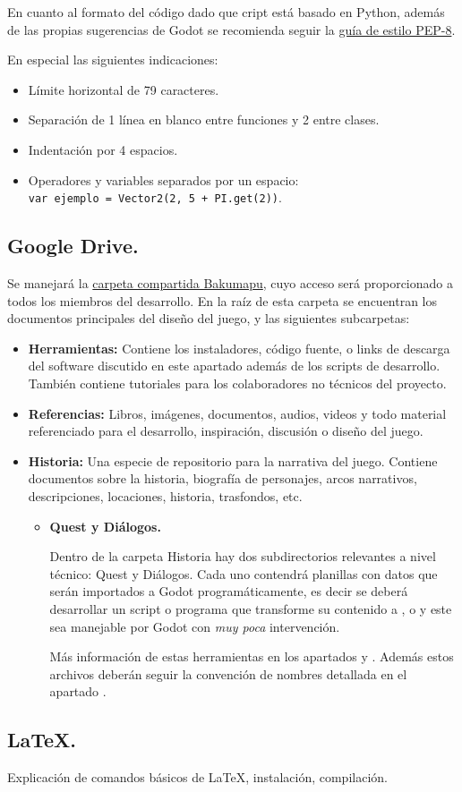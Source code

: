 En cuanto al formato del código dado que cript está basado en Python, además de las propias sugerencias de Godot se recomienda seguir la \href{https://www.python.org/dev/peps/pep-0008/}{guía de estilo PEP-8}.

En especial las siguientes indicaciones:
\begin{itemize}
	\item Límite horizontal de 79 caracteres. 
	\item Separación de 1 línea en blanco entre funciones y 2 entre clases.
	\item Indentación por 4 espacios.
	\item Operadores y variables separados por un espacio:\\\small \texttt{var ejemplo = Vector2(2, 5 + PI.get(2))}.
\end{itemize}





\subsection{Google Drive.}\label{flujo:google-drive}
Se manejará la \href{https://drive.google.com/open?id=1p8u-1UpXts8OHGRHEZLSIiQrqqx0Y4Kt}{carpeta compartida Bakumapu}, cuyo acceso será proporcionado a todos los miembros del desarrollo. En la raíz de esta carpeta se encuentran los documentos principales del diseño del juego, y las siguientes subcarpetas:
\begin{itemize}
	\item \textbf{Herramientas:} Contiene los instaladores, código fuente, o links de descarga del software discutido en este apartado además de los scripts de desarrollo. También contiene tutoriales para los colaboradores no técnicos del proyecto.
	\item \textbf{Referencias:} Libros, imágenes, documentos, audios, videos y todo material referenciado para el desarrollo, inspiración, discusión o diseño del juego.
	\item \textbf{Historia:} Una especie de repositorio para la narrativa del juego. Contiene documentos sobre la historia, biografía de personajes, arcos narrativos, descripciones, locaciones, historia, trasfondos, etc.
	\begin{itemize}
		\item \textbf{Quest y Diálogos.}
		
		Dentro de la carpeta Historia hay dos subdirectorios relevantes a nivel técnico: Quest y Diálogos. Cada uno contendrá planillas con datos que serán importados a Godot programáticamente, es decir se deberá desarrollar un script o programa que transforme su contenido a ,  o  y este sea manejable por Godot con \emph{muy poca} intervención.
		
		Más información de estas herramientas en los apartados  y . Además estos archivos deberán seguir la convención de nombres detallada en el apartado .
	\end{itemize}
\end{itemize}

\subsection{LaTeX.}\label{flujo:latex}
Explicación de comandos básicos de \LaTeX, instalación, compilación.
